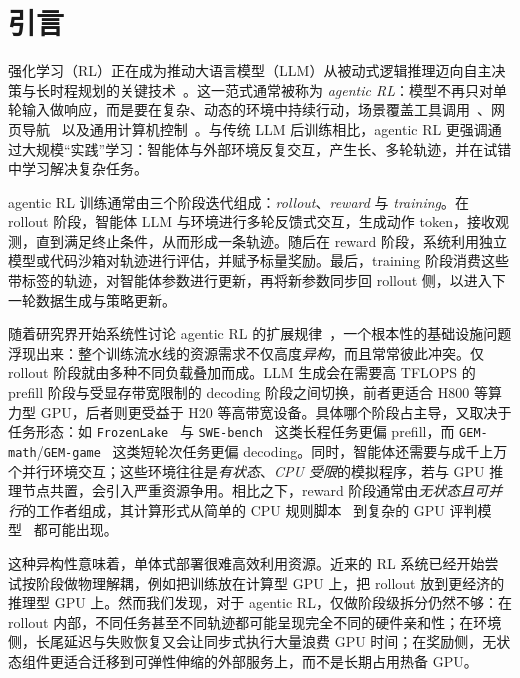 \section{引言}
\label{sec:introduction}

强化学习（RL）正在成为推动大语言模型（LLM）从被动式逻辑推理迈向自主决策与长时程规划的关键技术~\cite{deepseekr1,seed-thinking,openaio4}。这一范式通常被称为 \emph{agentic RL}：模型不再只对单轮输入做响应，而是要在复杂、动态的环境中持续行动，场景覆盖工具调用~\cite{hao2025exploringsuperiorfunctioncalls,wu2025agenticreasoningstreamlinedframework}、网页导航~\cite{song2025r1searcherincentivizingsearchcapability,jin2025searchr1trainingllmsreason,jiang2025deepretrievalhackingrealsearch} 以及通用计算机控制~\cite{luo2025guir1generalistr1style,lu2025uir1enhancingefficientaction,liu2025infigui}。与传统 LLM 后训练相比，agentic RL 更强调通过大规模“实践”学习：智能体与外部环境反复交互，产生长、多轮轨迹，并在试错中学习解决复杂任务。

agentic RL 训练通常由三个阶段迭代组成：\emph{rollout}、\emph{reward} 与 \emph{training}。在 rollout 阶段，智能体 LLM 与环境进行多轮反馈式交互，生成动作 token，接收观测，直到满足终止条件，从而形成一条轨迹。随后在 reward 阶段，系统利用独立模型或代码沙箱对轨迹进行评估，并赋予标量奖励。最后，training 阶段消费这些带标签的轨迹，对智能体参数进行更新，再将新参数同步回 rollout 侧，以进入下一轮数据生成与策略更新。

随着研究界开始系统性讨论 agentic RL 的扩展规律~\cite{kimiteam2025kimik2openagentic,deepseek_v3_2_speciale}，一个根本性的基础设施问题浮现出来：整个训练流水线的资源需求不仅高度\emph{异构}，而且常常彼此冲突。仅 rollout 阶段就由多种不同负载叠加而成。LLM 生成会在需要高 TFLOPS 的 prefill 阶段与受显存带宽限制的 decoding 阶段之间切换，前者更适合 H800 等算力型 GPU，后者则更受益于 H20 等高带宽设备。具体哪个阶段占主导，又取决于任务形态：如 \texttt{FrozenLake}~\cite{frozen_lake} 与 \texttt{SWE-bench}~\cite{swe-bench} 这类长程任务更偏 prefill，而 \texttt{GEM-math}/\texttt{GEM-game}~\cite{GEM-github} 这类短轮次任务更偏 decoding。同时，智能体还需要与成千上万个并行环境交互；这些环境往往是\emph{有状态}、\emph{CPU 受限}的模拟程序，若与 GPU 推理节点共置，会引入严重资源争用。相比之下，reward 阶段通常由\emph{无状态且可并行}的工作者组成，其计算形式从简单的 CPU 规则脚本~\cite{he2025deepmath,guo2024deepseekCoder} 到复杂的 GPU 评判模型~\cite{son2024llmasajudgerewardmodel,zhong2024rlhfuseefficientrlhftraining} 都可能出现。

这种异构性意味着，单体式部署很难高效利用资源。近来的 RL 系统已经开始尝试按阶段做物理解耦，例如把训练放在计算型 GPU 上，把 rollout 放到更经济的推理型 GPU 上。然而我们发现，对于 agentic RL，仅做阶段级拆分仍然不够：在 rollout 内部，不同任务甚至不同轨迹都可能呈现完全不同的硬件亲和性；在环境侧，长尾延迟与失败恢复又会让同步式执行大量浪费 GPU 时间；在奖励侧，无状态组件更适合迁移到可弹性伸缩的外部服务上，而不是长期占用热备 GPU。

